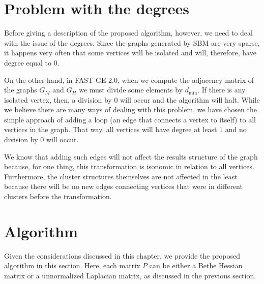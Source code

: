 \section{Problem with the degrees}
Before giving a description of the proposed algorithm, however, we need to deal with the issue of the degrees.
Since the graphs generated by SBM are very sparse, it happens very often that some vertices will be isolated and will, therefore, have degree equal to $0$.

On the other hand, in FAST-GE-2.0, when we compute the adjacency matrix of the graphs $G_M$ and $G_H$ we must divide some elements by $d_\text{min}$.
If there is any isolated vertex, then, a division by $0$ will occur and the algorithm will halt.
While we believe there are many ways of dealing with this problem, we have chosen the simple approach of adding a loop (an edge that connects a vertex to itself) to all vertices in the graph.
That way, all vertices will have degree at least $1$ and no division by $0$ will occur.

We know that adding such edges will not affect the results structure of the graph because, for one thing, this transformation is isonomic in relation to all vertices.
Furthermore, the cluster structures themselves are not affected in the least because there will be no new edges connecting vertices that were in different clusters before the transformation.

\section{Algorithm}
Given the considerations discussed in this chapter, we provide the proposed algorithm in this section.
Here, each matrix $P$ can be either a Bethe Hessian matrix or a unnormalized Laplacian matrix, as discussed in the previous section.

